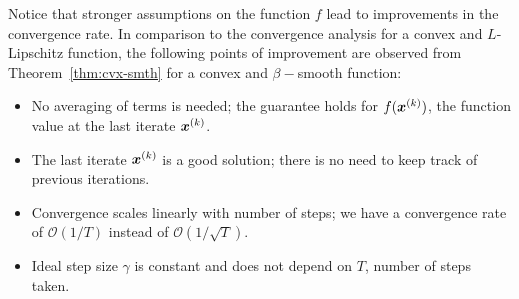 \documentclass{article}
\begin{document}
Notice that stronger assumptions on the function $f$ lead to improvements in the convergence rate.
In comparison to the convergence analysis for a convex and $L$-Lipschitz function, the following points of improvement are observed from Theorem~\ref{thm:cvx-smth} for a convex and $\beta-$smooth function:
\begin{itemize}
    \item No averaging of terms is needed; the guarantee holds for $f({\bm{x}}^{(k)})$, the function value at the last iterate ${\bm{x}}^{(k)}$.
    \item The last iterate ${\bm{x}}^{(k)}$ is a good solution; there is no need to keep track of previous iterations.
    \item Convergence scales linearly with number of steps; we have a convergence rate of $\mathcal{O}(1/T)$ instead of $\mathcal{O}(1/\sqrt{T})$.
    \item Ideal step size $\gamma$ is constant and does not depend on $T$, number of steps taken.
\end{itemize}
\end{document}
